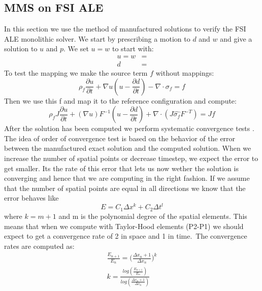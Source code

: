 \subsection{MMS on FSI ALE}
In this section we use the method of manufactured solutions to verify the FSI ALE monolithic solver. We start by prescribing a motion to $ d$ and $w$ and give a solution to $u$ and $p$. We set $u = w$ to start with:
\begin{align}
u =w &=  \\
d &= 
\end{align}
To test the mapping we make the source term $f$ without mappings:
$$ \rho_f \frac{\partial u}{\partial t}  +  \nabla u (u-\frac{\partial d}{\partial t})  -  \nabla \cdot \sigma_f  = f $$
Then we use this f and map it to the reference configuration and compute:
$$ \rho_f J \frac{\partial u}{\partial t} + (\nabla u)F^{-1}(u-\frac{\partial d}{\partial t})  + \nabla \cdot( J \hat{\sigma_f} F^{-T}) = J f$$
After the solution has been computed we perform systematic convergence tests \cite{Roache}. The idea of order of convergence test is based on the behavior of the error between the manufactured exact solution and the computed solution. When we increase the number of spatial points or decrease timestep, we expect the error to get smaller. Its the rate of this error that lets us now wether the solution is converging and hence that we are computing in the right fashion.
If we assume that the number of spatial points are equal in all directions we know that the error behaves like
$$ E = C_1 \Delta x^k+ C_2 \Delta t^l $$
where $ k = m+1 $ and m is the polynomial degree of the spatial elements. This means that when we compute with Taylor-Hood elements (P2-P1) we should expect to get a convergence rate of 2 in space and 1 in time.\
The convergence rates are computed as:
\begin{align}
\frac{E_{n+1}}{E_n} = \big( \frac{\Delta x_n+1}{\Delta x_n} \big)^k \\
k = \frac{log( \frac{E_{n+1}}{E_n}) }{ log(\frac{\Delta x_n+1}{\Delta x_n})}
\end{align}

